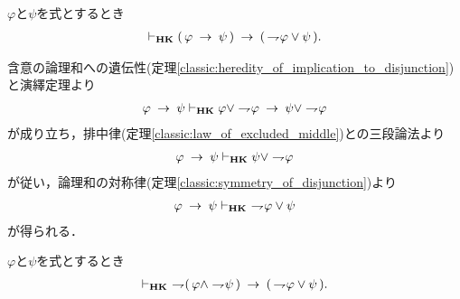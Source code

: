 	\begin{screen}
		\begin{thm}[含意は否定と論理和で表せる]
		\label{classic:implication_rewritable_by_disjunction_of_negation}
			$\varphi$と$\psi$を式とするとき
			\begin{align}
				\vdash_{{\scriptsize \mbox{{\bf HK}}}} (\, \varphi \hspace{0.25em}\rightarrow\hspace{0.25em} \psi\, )
				\hspace{0.25em}\rightarrow\hspace{0.25em} (\, \rightharpoondown\hspace{-0.25em} \varphi \vee \psi\, ).
			\end{align}
		\end{thm}
	\end{screen}
	
	\begin{sketch}
		含意の論理和への遺伝性(定理\ref{classic:heredity_of_implication_to_disjunction})
		と演繹定理より
		\begin{align}
			\varphi \hspace{0.25em}\rightarrow\hspace{0.25em} \psi \vdash_{{\scriptsize \mbox{{\bf HK}}}}
			\varphi \vee \rightharpoondown\hspace{-0.25em} \varphi \hspace{0.25em}\rightarrow\hspace{0.25em} \psi \vee \rightharpoondown\hspace{-0.25em} \varphi
		\end{align}
		が成り立ち，排中律(定理\ref{classic:law_of_excluded_middle})との三段論法より
		\begin{align}
			\varphi \hspace{0.25em}\rightarrow\hspace{0.25em} \psi \vdash_{{\scriptsize \mbox{{\bf HK}}}}
			\psi \vee \rightharpoondown\hspace{-0.25em} \varphi
		\end{align}
		が従い，論理和の対称律(定理\ref{classic:symmetry_of_disjunction})より
		\begin{align}
			\varphi \rarrow \psi \provable{\mbox{{\bf HK}}}\ 
			\negation \varphi \vee \psi
		\end{align}
		が得られる．
		\QED
	\end{sketch}
	
	\begin{screen}
		\begin{thm}[De Morganの法則2]
		\label{classic:De_Morgan_law_2}
			$\varphi$と$\psi$を式とするとき
			\begin{align}
				\provable{\mbox{{\bf HK}}}\ 
				\negation (\, \varphi \wedge \negation \psi\, )
				\rarrow (\, \negation \varphi \vee \psi\, ).
			\end{align}
		\end{thm}
	\end{screen}
	

